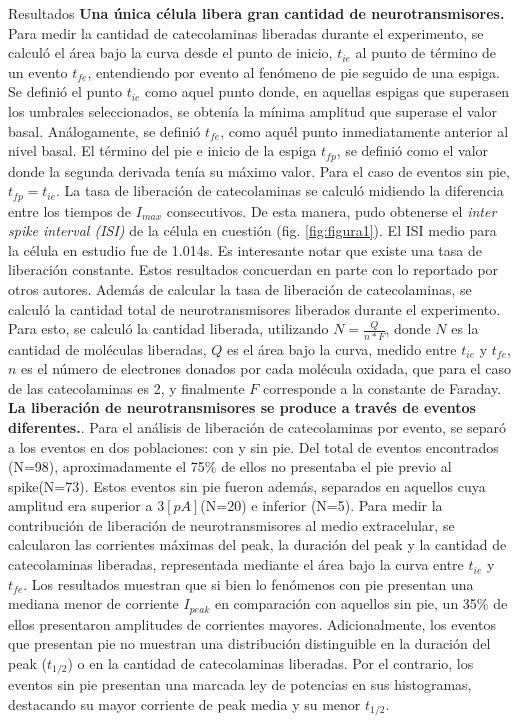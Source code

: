 \documentclass[twocolumn]{article}
\makeatletter
\def\section{\@startsection {section}{1}{\z@}{24pt plus 2pt minus 2pt}
{12pt plus 2pt minus 2pt}{\large\bf}}
\makeatother
\begin{document}
\section{Resultados}
{\bf Una única célula libera gran cantidad de neurotransmisores.} Para medir la cantidad de catecolaminas liberadas durante el experimento, se calculó el área bajo la curva desde el punto de inicio, $t_{ie}$ al punto de término de un evento $t_{fe}$, entendiendo por evento al fenómeno de pie seguido de una espiga.  Se definió el punto $t_{ie}$ como aquel punto donde, en aquellas espigas que superasen los umbrales seleccionados, se obtenía la mínima amplitud que superase el valor basal.  Análogamente, se definió $t_{fe}$, como aquél punto inmediatamente anterior al nivel basal. El término del pie e inicio de la espiga $t_{fp}$, se definió como el valor donde la segunda derivada tenía su máximo valor\citep{evanko2005primer}.  Para el caso de eventos sin pie, $t_{fp} = t_{ie}$.
La tasa de liberación de catecolaminas se calculó midiendo la diferencia entre los tiempos de $I_{max}$ consecutivos.  De esta manera, pudo obtenerse el \textit{inter spike interval (ISI)} de la célula en cuestión (fig. \ref{fig:figura1}). El ISI medio para la célula en estudio fue de 1.014s.  
Es interesante notar que existe una tasa de liberación constante. Estos resultados concuerdan en parte con lo reportado por otros autores\citep{jarukanont2015vesicle}.  
Además de calcular la tasa de liberación de catecolaminas, se calculó la cantidad total de neurotransmisores liberados durante el experimento.  Para esto, se calculó la cantidad liberada, utilizando $N = \frac{Q}{n*F}$, donde $N$ es la cantidad de moléculas liberadas, $Q$ es el área bajo la curva, medido entre $t_{ie}$ y $t_{fe}$, $n$ es el número de electrones donados por cada molécula oxidada, que para el caso de las catecolaminas es 2, y finalmente $F$ corresponde a la constante de Faraday\citep{evanko2005primer}.\\
{\bf La liberación de neurotransmisores se produce a través de eventos diferentes.}. Para el análisis de liberación de catecolaminas por evento, se separó a los eventos en dos poblaciones: con y sin pie.  Del total de eventos encontrados (N=98), aproximadamente el 75\% de ellos no presentaba el pie previo al spike(N=73).  Estos eventos sin pie fueron además, separados en aquellos cuya amplitud era superior a $3[pA]$(N=20) e inferior (N=5).
Para medir la contribución de liberación de neurotransmisores al medio extracelular, se calcularon las corrientes máximas del peak, la duración del peak y la cantidad de catecolaminas liberadas, representada mediante el área bajo la curva entre $t_{ie}$ y $t_{fe}$. Los resultados muestran que si bien lo fenómenos con pie presentan una mediana menor de corriente $I_{peak}$ en comparación con aquellos sin pie, un 35\% de ellos presentaron amplitudes de corrientes mayores.  Adicionalmente, los eventos que presentan pie no muestran una distribución distinguible en la duración del peak ($t_{1/2}$) o en la cantidad de catecolaminas liberadas.
Por el contrario, los eventos sin pie presentan una marcada ley de potencias en sus histogramas, destacando su mayor corriente de peak media y su menor $t_{1/2}$.
\end{document}
